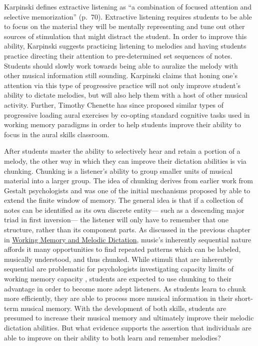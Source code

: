 \documentclass[12pt,]{book}
\begin{document}
Karpinski defines extractive listening as ``a combination of focused attention and selective memorization'' (p.~70).
Extractive listening requires students to be able to focus on the material they will be mentally representing and tune out other sources of stimulation that might distract the student.
In order to improve this ability, Karpinski suggests practicing listening to melodies and having students practice directing their attention to pre-determined set sequences of notes.
Students should slowly work towards being able to auralize the melody with other musical information still sounding.
Karpinski claims that honing one's attention via this type of progressive practice will not only improve student's ability to dictate melodies, but will also help them with a host of other musical activity.
Further, Timothy Chenette has since proposed similar types of progressive loading aural exercises by co-opting standard cognitive tasks used in working memory paradigms \citep{chenetteReframingAuralSkills2019} in order to help students improve their ability to focus in the aural skills classroom.

After students master the ability to selectively hear and retain a portion of a melody, the other way in which they can improve their dictation abilities is via chunking.
Chunking is a listener's ability to group smaller units of musical material into a larger group.
The idea of chunking derives from earlier work from Gestalt psychologists and was one of the initial mechanisms proposed by \citet{millerMagicalNumberSeven1956} able to extend the finite window of memory.
The general idea is that if a collection of notes can be identified as its own discrete entity--- such as a descending major triad in first inversion--- the listener will only have to remember that one structure, rather than its component parts.
As discussed in the previous chapter in \protect\hyperlink{working-memory-and-melodic-dictation}{Working Memory and Melodic Dictation}, music's inherently sequential nature affords it many opportunities to find repeated patterns which can be labeled, musically understood, and thus chunked.
While stimuli that are inherently sequential are problematic for psychologists investigating capacity limits of working memory capacity \citep{cowanWorkingMemoryCapacity2005}, students are expected to use chunking to their advantage in order to become more adept listeners.
As students learn to chunk more efficiently, they are able to process more musical information in their short-term musical memory.
With the development of both skills, students are presumed to increase their musical memory and ultimately improve their melodic dictation abilities.
But what evidence supports the assertion that individuals are able to improve on their ability to both learn and remember melodies?
\end{document}
